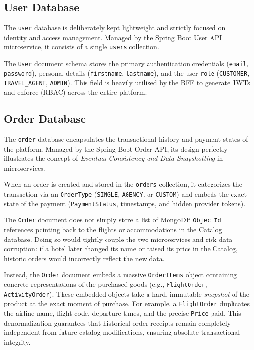 \subsection{User Database}

The \texttt{user} database is deliberately kept lightweight and strictly focused on identity and access management. Managed by the Spring Boot User API microservice, it consists of a single \texttt{users} collection. 

The \texttt{User} document schema stores the primary authentication credentials (\texttt{email}, \texttt{password}), personal details (\texttt{firstname}, \texttt{lastname}), and the user \texttt{role} (\texttt{CUSTOMER}, \texttt{TRAVEL\_AGENT}, \texttt{ADMIN}). This field is heavily utilized by the BFF to generate JWTs and enforce (\gls{RBAC}) across the entire platform.

\subsection{Order Database}

The \texttt{order} database encapsulates the transactional history and payment states of the platform. Managed by the Spring Boot Order API, its design perfectly illustrates the concept of \textit{Eventual Consistency and Data Snapshotting} in microservices.

When an order is created and stored in the \texttt{orders} collection, it categorizes the transaction via an \texttt{OrderType} (\texttt{SINGLE}, \texttt{AGENCY}, or \texttt{CUSTOM}) and embeds the exact state of the payment (\texttt{PaymentStatus}, timestamps, and hidden provider tokens). 

The \texttt{Order} document does not simply store a list of MongoDB \texttt{ObjectId} references pointing back to the flights or accommodations in the Catalog database. Doing so would tightly couple the two microservices and risk data corruption: if a hotel later changed its name or raised its price in the Catalog, historic orders would incorrectly reflect the new data.

Instead, the \texttt{Order} document embeds a massive \texttt{OrderItems} object containing concrete representations of the purchased goods (e.g., \texttt{FlightOrder}, \texttt{ActivityOrder}). These embedded objects take a hard, immutable \textit{snapshot} of the product at the exact moment of purchase. For example, a \texttt{FlightOrder} duplicates the airline name, flight code, departure times, and the precise \texttt{Price} paid. This denormalization guarantees that historical order receipts remain completely independent from future catalog modifications, ensuring absolute transactional integrity.

